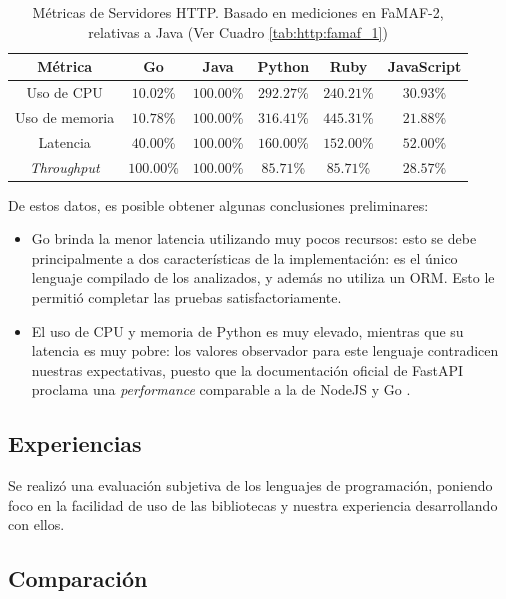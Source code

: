 \documentclass[11pt]{article}
\let\Oldsubsection\subsection
\renewcommand{\subsection}{\FloatBarrier\Oldsubsection}
\newcommand{\english}[1]{\textit{#1}}
\begin{document}
\begin{table}[h]
\centering
\begin{tabular}{|c|c|c|c|c|c|}
\hline
Métrica & Go       & Java     & Python   & Ruby     & JavaScript \\ \hline
Uso de CPU   & $10.02$\%  & $100.00$\% & $292.27$\% & $240.21$\% & $30.93$\%    \\ \hline
Uso de memoria  & $10.78$\%  & $100.00$\% & $316.41$\% & $445.31$\% & $21.88$\%    \\ \hline
Latencia     & $40.00$\%  & $100.00$\% & $160.00$\% & $152.00$\% & $52.00$\%    \\ \hline
\textit{Throughput} & $100.00$\% & $100.00$\% & $85.71$\%  & $85.71$\%  & $28.57$\%    \\ \hline
\end{tabular}
\caption{Métricas de Servidores HTTP. Basado en mediciones en FaMAF-2, relativas a Java (Ver Cuadro \ref{tab:http:famaf_1})}
\label{tab:http:metrics}
\end{table}

De estos datos, es posible obtener algunas conclusiones preliminares:

\begin{itemize}
    \item Go brinda la menor latencia utilizando muy pocos recursos: esto se debe principalmente a dos características de la implementación: es el único lenguaje compilado de los analizados, y además no utiliza un ORM. Esto le permitió completar las pruebas satisfactoriamente.
    \item El uso de CPU y memoria de Python es muy elevado, mientras que su latencia es muy pobre: los valores observador para este lenguaje contradicen nuestras expectativas, puesto que la documentación oficial de FastAPI proclama una \english{performance} comparable a la de NodeJS y Go \cite{http:fastapi_performance}.
\end{itemize}

\subsection{Experiencias}

Se realizó una evaluación subjetiva de los lenguajes de programación, poniendo foco en la facilidad de uso de las bibliotecas y nuestra experiencia desarrollando con ellos.

\subsection{Comparación}
\end{document}
